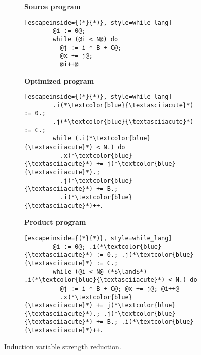 \begin{figure}
  \centering
  \begin{subfigure}[b]{0.45\textwidth}
    \begin{minipage}[t]{\linewidth}
      \textbf{Source program}
      \begin{lstlisting}[escapeinside={(*}{*)}, style=while_lang]
        @i := 0@; 
        while (@i < N@) do
          @j := i * B + C@;
          @x += j@;
          @i++@
      \end{lstlisting}
    \end{minipage}
  \end{subfigure}
  \hfill
  \begin{subfigure}[b]{0.45\textwidth}
    \begin{minipage}[t]{\linewidth}
      \textbf{Optimized program}
      \begin{lstlisting}[escapeinside={(*}{*)}, style=while_lang]
        .i(*\textcolor{blue}{\textasciiacute}*) := 0.;
        .j(*\textcolor{blue}{\textasciiacute}*) := C.;
        while (.i(*\textcolor{blue}{\textasciiacute}*) < N.) do
          .x(*\textcolor{blue}{\textasciiacute}*) += j(*\textcolor{blue}{\textasciiacute}*).;
          .j(*\textcolor{blue}{\textasciiacute}*) += B.;
          .i(*\textcolor{blue}{\textasciiacute}*)++.
      \end{lstlisting}
    \end{minipage}
  \end{subfigure}
  \hfill
  \begin{subfigure}[b]{0.9\textwidth}
    \begin{minipage}[t]{\linewidth}
      \textbf{Product program}
      \begin{lstlisting}[escapeinside={(*}{*)}, style=while_lang]
        @i := 0@; .i(*\textcolor{blue}{\textasciiacute}*) := 0.; .j(*\textcolor{blue}{\textasciiacute}*) := C.;
        while (@i < N@ (*$\land$*) .i(*\textcolor{blue}{\textasciiacute}*) < N.) do
          @j := i * B + C@; @x += j@; @i++@
          .x(*\textcolor{blue}{\textasciiacute}*) += j(*\textcolor{blue}{\textasciiacute}*).; .j(*\textcolor{blue}{\textasciiacute}*) += B.; .i(*\textcolor{blue}{\textasciiacute}*)++.
      \end{lstlisting}
    \end{minipage}
  \end{subfigure}
  \caption{Induction variable strength reduction.}
  \label{fig:induction_var_strength_red}
\end{figure}

